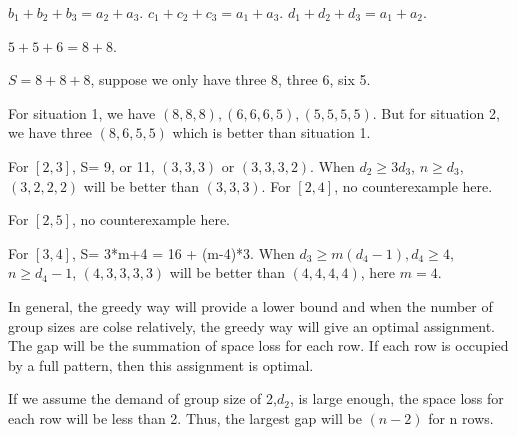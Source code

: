 $b_1 + b_2 + b_3 = a_2 + a_3$.
$c_1 + c_2 + c_3 = a_1 + a_3$.
$d_1 + d_2 + d_3 = a_1 + a_2$.

$5 + 5 + 6 = 8 + 8$.

$S = 8+8+8$, suppose we only have three 8, three 6, six 5.

For situation 1, we have $(8,8,8),(6,6,6,5),(5,5,5,5)$.
But for situation 2, we have three $(8,6,5,5)$ which is better than situation 1.

For $[2,3]$, S= 9, or 11, $(3,3,3)$ or $(3,3,3,2)$. When $d_2 \geq 3d_3$, $n \geq d_3$, $(3,2,2,2)$ will be better than $(3,3,3)$.
For $[2,4]$, no counterexample here.

For $[2,5]$, no counterexample here.

For $[3,4]$, S= 3*m+4 = 16 + (m-4)*3. When $d_3 \geq m(d_4-1), d_4 \geq 4$, $n \geq d_4-1$, $(4,3,3,3,3)$ will be better than $(4,4,4,4)$, here $m=4$.

In general, the greedy way will provide a lower bound and when the number of group sizes are colse relatively, the greedy way will give an optimal assignment. The gap will be the summation of space loss for each row. If each row is occupied by a full pattern, then this assignment is optimal.

If we assume the demand of group size of 2,$d_2$, is large enough, the space loss for each row will be less than 2. Thus, the largest gap will be $(n-2)$ for n rows.


\newpage
